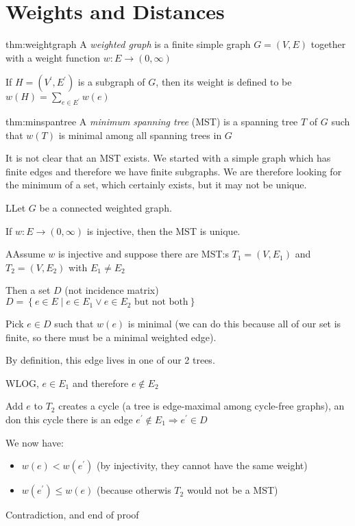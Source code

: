\section{Weights and Distances}\par
\begin{theo}{thm:weightgraph}
  A \textit{weighted graph} is a finite simple graph $G = (V,E)$ together with a weight function $w:E\to(0,\infty)$
  \par\bigskip
  \noindent If $H = (V^{\prime}, E^{\prime})$ is a subgraph of $G$, then its weight is defined to be $w(H) = \sum_{e\in E^{\prime}}w(e)$ 
\end{theo}
\par\bigskip
\begin{theo}{thm:minspantree}
  A \textit{minimum spanning tree} (MST) is a spanning tree $T$ of $G$ such that $w(T)$ is minimal among all spanning trees in $G$ 
\end{theo}
\par\bigskip
\noindent It is not clear that an MST exists. We started with a simple graph which has finite edges and therefore we have finite subgraphs. We are therefore looking for the minimum of a set, which certainly exists, but it may not be unique.
\par\bigskip
\begin{lem}
  LLet $G$ be a connected weighted graph.
  \par\bigskip
  \noindent If $w:E\to(0,\infty)$ is injective, then the MST is unique.
\end{lem}
\par\bigskip
\begin{prf}
  AAssume $w$ is injective and suppose there are MST:s $T_1 = (V,E_1)$ and $T_2 = (V,E_2)$ with $E_1\neq E_2$
  \par\bigskip
  \noindent Then a set $D$ (not incidence matrix) $D = \left\{e\in E\;|\; e\in E_1\vee e\in E_2\text{ but not both}\right\}$
  \par\bigskip
  \noindent Pick $e\in D$ such that $w(e)$ is minimal (we can do this because all of our set is finite, so there must be a minimal weighted edge).\par
  \noindent By definition, this edge lives in one of our 2 trees.
  \par\bigskip
  \noindent WLOG, $e\in E_1$ and therefore $e\not\in E_2$
  \par\bigskip
  \noindent Add $e$ to $T_2$ creates a cycle (a tree is edge-maximal among cycle-free graphs), an don this cycle there is an edge $e^{\prime}\not\in E_1\Rightarrow e^{\prime}\in D$
  \par\bigskip
  \noindent We now have:\par
  \begin{itemize}
    \item $w(e)<w(e^{\prime})$ (by injectivity, they cannot have the same weight)\par
    \item $w(e^{\prime})\leq w(e)$ (because otherwis $T_2$ would not be a MST)
  \end{itemize}
  \par\bigskip
  \noindent Contradiction, and end of proof
\end{prf}
